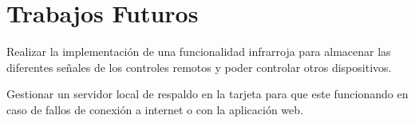 \chapter{Trabajos Futuros}

Realizar la implementación de una funcionalidad infrarroja para almacenar las diferentes señales de los controles remotos y poder controlar otros dispositivos.

Gestionar un servidor local de respaldo en la tarjeta para que este funcionando en caso de fallos de conexión a internet o con la aplicación web.